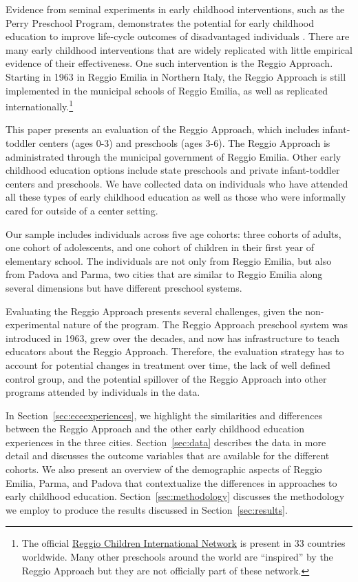 Evidence from seminal experiments in early childhood interventions, such as the Perry Preschool Program, demonstrates the potential for early childhood education to improve life-cycle outcomes of disadvantaged individuals \citep{Heckman_Moon_etal_2010_QE, Elango_Hojman_etal_2016_Early-Edu}. There are many early childhood interventions that are widely replicated with little empirical evidence of their effectiveness. One such intervention is the Reggio Approach. Starting in 1963 in Reggio Emilia in Northern Italy, the Reggio Approach is still implemented in the municipal schools of Reggio Emilia, as well as replicated internationally.\footnote{The official \href{http://www.reggiochildren.it/network/?lang=en}{Reggio Children International Network} is present in 33 countries worldwide. Many other preschools around the world are ``inspired'' by the Reggio Approach but they are not officially part of these network.}

This paper presents an evaluation of the Reggio Approach, which includes infant-toddler centers (ages 0-3) and preschools (ages 3-6). The Reggio Approach is administrated through the municipal government of Reggio Emilia. Other early childhood education options include state preschools and private infant-toddler centers and preschools. We have collected data on individuals who have attended all these types of early childhood education as well as those who were informally cared for outside of a center setting. 

Our sample includes individuals across five age cohorts: three cohorts of adults, one cohort of adolescents, and one cohort of children in their first year of elementary school. The individuals are not only from Reggio Emilia, but also from Padova and Parma, two cities that are similar to Reggio Emilia along several dimensions but have different preschool systems. 

Evaluating the Reggio Approach presents several challenges, given the non-experimental nature of the program. The Reggio Approach preschool system was introduced in 1963, grew over the decades, and now has infrastructure to teach educators about the Reggio Approach. Therefore, the evaluation strategy has to account for potential changes in treatment over time, the lack of well defined control group, and the potential spillover of the Reggio Approach into other programs attended by individuals in the data. 


In Section~\ref{sec:eceexperiences}, we highlight the similarities and differences between the Reggio Approach and the other early childhood education experiences in the three cities. Section~\ref{sec:data} describes the data in more detail and discusses the outcome variables that are available for the different cohorts. We also present an overview of the demographic aspects of Reggio Emilia, Parma, and Padova that contextualize the differences in approaches to early childhood education. Section~\ref{sec:methodology} discusses the methodology we employ to produce the results discussed in Section~\ref{sec:results}. 
